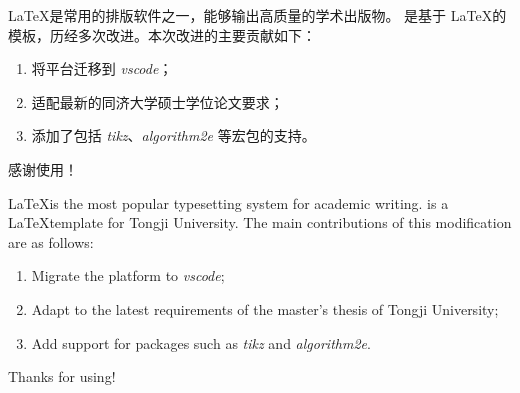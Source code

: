 \begin{cabstract}
  \LaTeX 是常用的排版软件之一，能够输出高质量的学术出版物。
  \tongjithesis{} 是基于 \LaTeX 的模板，历经多次改进。本次改进的主要贡献如下：
  
  \begin{enumerate}[1.]
    \item 将平台迁移到 \emph{vscode}；
    \item 适配最新的同济大学硕士学位论文要求；
    \item 添加了包括 \emph{tikz}、\emph{algorithm2e} 等宏包的支持。
  \end{enumerate}

  感谢使用！

\end{cabstract}


\begin{eabstract}
  \LaTeX is the most popular typesetting system for academic writing.
  \tongjithesis{} is a \LaTeX template for Tongji University. The main contributions of this modification are as follows:

  \begin{enumerate}[1.]
    \item Migrate the platform to \emph{vscode};
    \item Adapt to the latest requirements of the master's thesis of Tongji University;
    \item Add support for packages such as \emph{tikz} and \emph{algorithm2e}.
  \end{enumerate}

  Thanks for using!
\end{eabstract}

